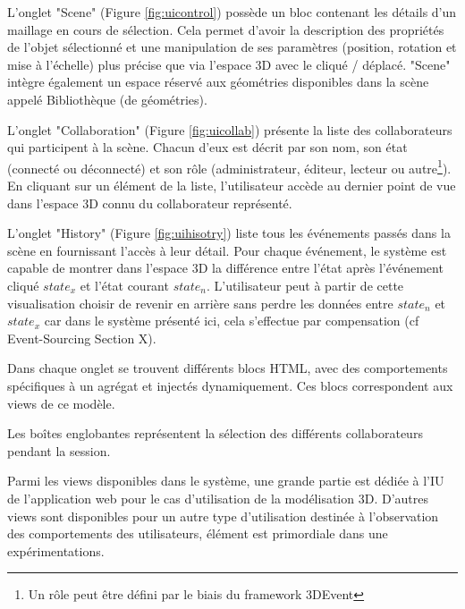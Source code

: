 L'onglet "Scene" (Figure \ref{fig:uicontrol}) possède un bloc contenant les détails 
d'un 
maillage en cours de 
sélection. Cela permet d'avoir la description des propriétés de l'objet sélectionné et 
une manipulation de ses paramètres (position, rotation et mise à l'échelle) plus 
précise que via l'espace \gls{3D} avec le cliqué / déplacé. "Scene" intègre 
également un espace réservé aux géométries disponibles dans la scène appelé 
Bibliothèque (de géométries).

L'onglet "Collaboration" (Figure \ref{fig:uicollab}) présente la liste des 
collaborateurs qui 
participent à la 
scène. Chacun d'eux est décrit par son nom, son état  (connecté ou déconnecté) 
et son rôle (administrateur, éditeur, lecteur ou autre\footnote{Un rôle peut être 
défini par le biais du \gls{framework} 3DEvent}). En cliquant sur un élément de la 
liste, l'utilisateur accède au dernier point de vue dans l'espace \gls{3D} connu du 
collaborateur représenté.

L'onglet "History" (Figure \ref{fig:uihisotry}) liste tous les événements passés dans 
la 
scène en fournissant 
l'accès à leur détail. Pour chaque événement, le système est capable de montrer 
dans l'espace \gls{3D} la différence entre l'état  après l'événement cliqué $state_x$ 
et l'état courant $state_n$. L'utilisateur peut à partir de cette visualisation choisir 
de \og revenir en arrière\fg{} sans perdre les données entre $state_n$ et $state_x$ 
car dans le système présenté ici, cela s'effectue par compensation (cf Event-Sourcing 
Section X).

Dans chaque onglet se trouvent différents blocs \gls{HTML}, avec des 
comportements spécifiques à un agrégat et injectés dynamiquement. Ces blocs 
correspondent aux views de ce modèle.

Les boîtes englobantes représentent la sélection des différents collaborateurs 
pendant la session.

Parmi les views disponibles dans le système, une grande partie est dédiée à 
l'\gls{IU} de l'application web pour le cas d'utilisation de la modélisation 3D. 
D'autres views sont disponibles pour un autre type d'utilisation destinée à 
l'observation des comportements des utilisateurs, élément est primordiale dans une expérimentations.



